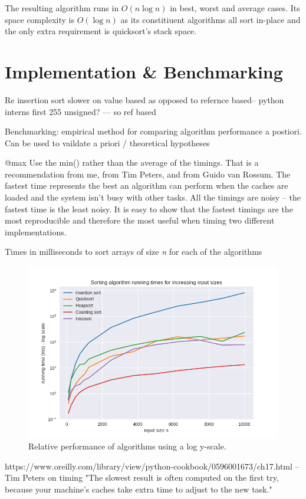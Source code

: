 \documentclass[12pt, a4paper]{article}
\begin{document}
The resulting algorithm runs in $O(n\log n)$ in best, worst and average cases. Its space complexity is $O(\log n)$ as its constitiuent algorithms all sort in-place and the only extra requirement is quicksort's stack space.


\section{Implementation \& Benchmarking}

Re insertion sort slower on value based as opposed to refernce based-- python interns first 255 unsigned? --- so ref based

Benchmarking: empirical method for comparing algorithm performance a postiori. Can be used to vaildate a priori / theoretical hypotheses

@max Use the min() rather than the average of the timings. That is a recommendation from me, from Tim Peters, and from Guido van Rossum. The fastest time represents the best an algorithm can perform when the caches are loaded and the system isn't busy with other tasks. All the timings are noisy -- the fastest time is the least noisy. It is easy to show that the fastest timings are the most reproducible and therefore the most useful when timing two different implementations.



\begin{table}[h]
    \resizebox{\textwidth}{!}{%
    
    }
\caption{Times in milliseconds to sort arrays of size \emph{n} for each of the algorithms}
\end{table}

\begin{figure}
    \includegraphics[width=\linewidth]{bm_output/plot_0_log_20210510-153504.png}
    \caption{Relative performance of algorithms using a log y-scale.}
    \label{fig:log-perf}
  \end{figure}


https://www.oreilly.com/library/view/python-cookbook/0596001673/ch17.html 
-- Tim Peters on timing \textcite{peters2002}
"The slowest result is often computed on the first try, because your machine’s caches take extra time to adjust to the new task."




\printbibliography
\end{document}
